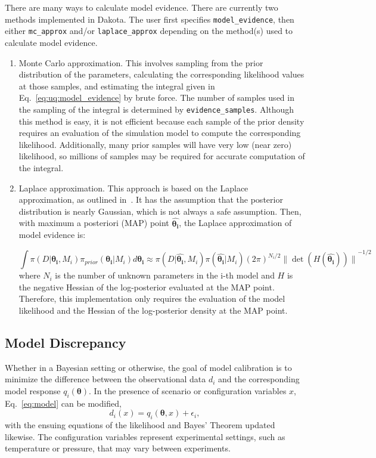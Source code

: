 There are many ways to calculate model evidence. There are currently two methods 
implemented in Dakota. The user first specifies \texttt{model\_evidence}, then either 
\texttt{mc\_approx} and/or \texttt{laplace\_approx} depending on the
method(s) used to calculate model evidence.
\begin{enumerate}
\item Monte Carlo approximation.  This involves sampling from the prior 
distribution of the parameters, calculating the corresponding likelihood values 
at those samples, and  estimating the integral given in Eq.~\ref{eq:uq:model_evidence} 
by brute force.  The number of samples used in the sampling of the integral is 
determined by \texttt{evidence\_samples}. Although this method is easy, 
it is not efficient because each sample of the prior density requires 
an evaluation of the simulation model to compute the corresponding likelihood.  
Additionally, many prior samples will have very low (near zero) likelihood, 
so millions of samples may be required for accurate computation of the integral. 
\item Laplace approximation.  This approach is based on the Laplace approximation, 
as outlined in~\cite{Wasserman}.  It has the assumption that the posterior distribution 
is nearly Gaussian, which is not always a safe assumption. 
Then, with maximum a posteriori (MAP) point $\hat{\boldsymbol{\theta_i}}$, 
the Laplace approximation of model evidence is: 
  
\begin{equation}
\int \pi(D|\boldsymbol{\theta_i},M_i)\pi_{prior}(\boldsymbol{\theta_i}|M_i)d \boldsymbol{\theta_i} \approx \pi(D|\hat{\boldsymbol{\theta_i}},M_i)\pi(\hat{\boldsymbol{\theta_i}}|M_i)(2\pi)^{N_i/2}{\|\det(H(\hat{\boldsymbol{\theta_i}}))\|}^{-1/2}
\end{equation}
where $N_i$ is the number of unknown parameters in the i-th model and 
$H$ is the negative Hessian of the log-posterior evaluated at the MAP point. 
Therefore, this implementation only requires the evaluation of the model likelihood 
and the Hessian of the log-posterior density at the MAP point. 

\end{enumerate}

\subsection{Model Discrepancy}
Whether in a Bayesian setting or otherwise, the goal of model calibration
is to minimize the difference between the observational data $d_i$ and 
the corresponding model response $q_i(\boldsymbol{\theta})$. In the 
presence of scenario or configuration variables $x$, Eq.~\ref{eq:model} can
be modified,
\begin{equation}
d_i(x) = q_i\left(\boldsymbol{\theta}, x\right) + \epsilon_i,
\end{equation} 
with the ensuing equations of the likelihood and Bayes' Theorem updated 
likewise. The configuration variables represent experimental settings, such 
as temperature or pressure, that may vary between experiments. 

